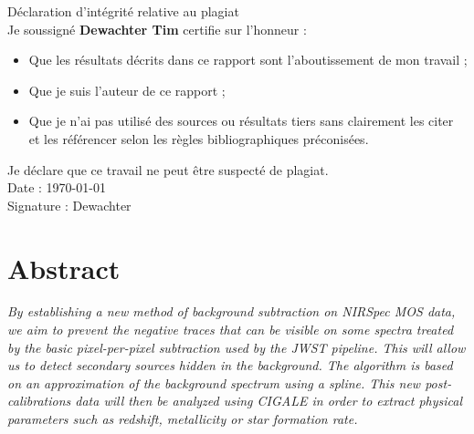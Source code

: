 \documentclass[12pt, a4paper]{article}
\begin{document}
\newpage
\begin{center}
  \vspace*{\fill}

  Déclaration d'intégrité relative au plagiat \\

  

  Je soussigné \textbf{Dewachter Tim} certifie sur l'honneur : \\

  \begin{itemize}
    \centering
    \item Que les résultats décrits dans ce rapport sont l'aboutissement de mon travail ;\\
    \item Que je suis l'auteur de ce rapport ;\\
    \item Que je n'ai pas utilisé des sources ou résultats tiers sans clairement les citer et les référencer selon les règles bibliographiques préconisées.\\
  \end{itemize}

  Je déclare que ce travail ne peut être suspecté de plagiat. \\


  Date : \today\\

  

  Signature : Dewachter

  \vspace*{\fill}
\end{center}
\newpage

\tableofcontents

\newpage

\section{Abstract}

\textit{By establishing a new method of background subtraction on NIRSpec MOS data, we aim to prevent the negative traces that can be visible on some spectra treated by the basic pixel-per-pixel subtraction used by the JWST pipeline. This will allow us to detect secondary sources hidden in the background. The algorithm is based on an approximation of the background spectrum using a spline. This new post-calibrations data will then be analyzed using CIGALE in order to extract physical parameters such as redshift, metallicity or star formation rate.}
\end{document}
